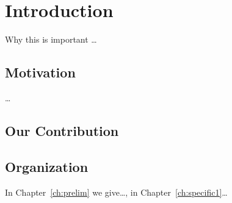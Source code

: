 \documentclass[../thesis.tex]{subfiles}
\begin{document}
\chapter{Introduction}
\label{ch:intro}
Why this is important \ldots 
\lipsum[4]
\section{Motivation}
\lipsum[5]
\ldots
\section{Our Contribution}
\lipsum[6]

\section{Organization}
In Chapter~\ref{ch:prelim} we give\ldots, in Chapter~\ref{ch:specific1}\ldots

\lipsum[7]
\end{document}
